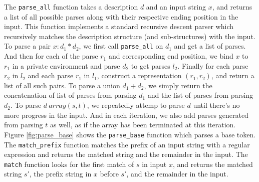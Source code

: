 %
The {\tt parse\_all} function takes a description $d$ and an input string $x$, and returns
a list of all possible parses along with their respective ending position in the input. 
This function implements a standard recursive descent parser which recursively matches the
description structure (and sub-structures) with the input. To parse a pair $x: d_1 * d_2$, 
we first call {\tt parse\_all} on $d_1$ and get a list of parses. 
And then for each of the parse $r_1$ and corresponding end position, we bind $x$ to $r_1$ in
a private environment and  parse $d_2$ to get parses $l_2$. 
Finally for each parse $r_2$ in $l_2$ and each parse $r_1$ in $l_1$, 
construct a representation $(r_1, r_2)$, and return a list of all such pairs.
To parse a union $d_1 + d_2$, we simply return the concatenation of list of parses from
parsing $d_1$ and the list of parses from parsing $d_2$. To parse $d~ array(s, t)$,
we repeatedly attemp to parse $d$ until there's no more progress in the input.
And in each iteration, we also add parses generated from parsing $t$ as well, as if
the array has been terminated at this iteration. Figure \ref{fig:parse_base}
shows the {\tt parse\_base} function which parses a base token. The {\tt match\_prefix}
function matches the prefix of an input string with a regular expression and returns
the matched string and the remainder in the input. The {\tt match} function looks for
the first match of $s$ in input $x$, and returns the matched string $s'$, the prefix string
in $x$ before $s'$, and the remainder in the input.

